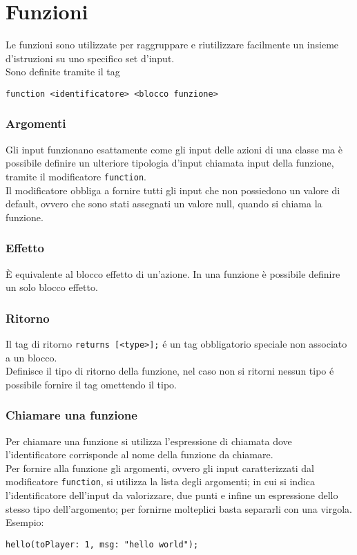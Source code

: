 \section{Funzioni}
Le funzioni sono utilizzate per raggruppare e riutilizzare facilmente un insieme d'istruzioni 
su uno specifico set d'input. \\ 
Sono definite tramite il tag 
\begin{lstlisting}
function <identificatore> <blocco funzione>
\end{lstlisting}

\subsubsection{Argomenti}
Gli input funzionano esattamente come gli input delle azioni di una classe ma è 
possibile definire un ulteriore tipologia d'input chiamata input della funzione,
tramite il modificatore \lstinline|function|. \\
Il modificatore obbliga a fornire tutti gli input che non possiedono un valore di default,
ovvero che sono stati assegnati un valore null, quando si chiama la funzione.

\subsubsection{Effetto}
È equivalente al blocco effetto di un’azione. 
In una funzione è possibile definire un solo blocco effetto.

\subsubsection{Ritorno}
Il tag di ritorno \lstinline|returns [<type>];| é un tag obbligatorio speciale non associato a un blocco. \\
Definisce il tipo di ritorno della funzione, nel caso non si ritorni nessun tipo é possibile 
fornire il tag omettendo il tipo.

\subsubsection{Chiamare una funzione} \label{ChiamataFunzione}
Per chiamare una funzione si utilizza l'espressione di chiamata dove l'identificatore corrisponde al nome
della funzione da chiamare. \\
Per fornire alla funzione gli argomenti, ovvero gli input caratterizzati dal modificatore \lstinline|function|, si 
utilizza la lista degli argomenti; in cui si indica l'identificatore dell'input da valorizzare, due punti e 
infine un espressione dello stesso tipo dell'argomento; per fornirne molteplici basta separarli con una virgola. Esempio:
\begin{lstlisting}
hello(toPlayer: 1, msg: "hello world");
\end{lstlisting}

